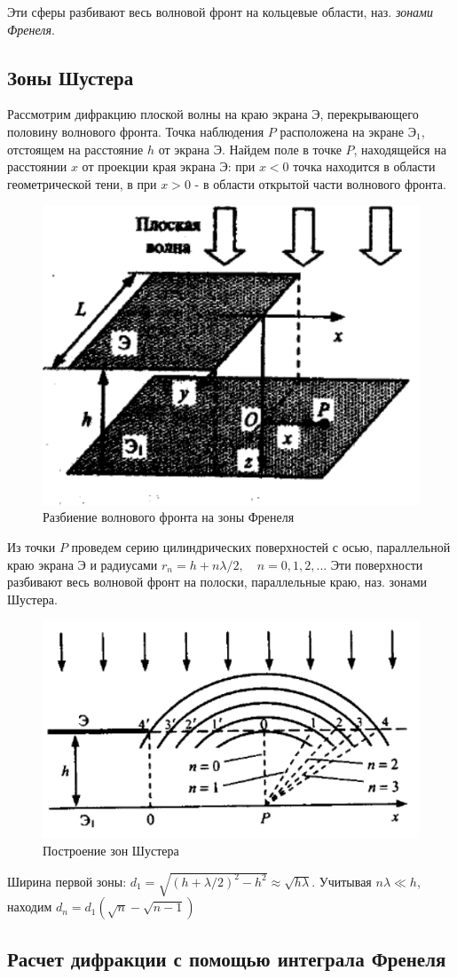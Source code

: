 \documentclass[a4paper,12pt]{article}
\begin{document}
Эти сферы разбивают весь волновой фронт на кольцевые области, наз. \textit{зонами Френеля}.

\subsection{Зоны Шустера}

Рассмотрим дифракцию плоской волны на краю экрана Э, перекрывающего половину волнового фронта. Точка наблюдения $P$ расположена на экране $\text{Э}_1$, отстоящем на расстояние $h$ от экрана Э. Найдем поле в точке $P$, находящейся на расстоянии $x$ от проекции края экрана Э: при $x<0$ точка находится в области геометрической тени, в при $x>0$ - в области открытой части волнового фронта.

\begin{figure}[h]
\centering
\includegraphics[width=0.4\linewidth]{img7.png}
\caption{Разбиение волнового фронта на зоны Френеля}
\label{img7}
\end{figure}

Из точки $P$ проведем серию цилиндрических поверхностей с осью, параллельной краю экрана Э и радиусами $r_n=h+n\lambda/2, \quad n=0,1,2,..$. Эти поверхности разбивают весь волновой фронт на полоски, параллельные краю, наз. зонами Шустера.

\begin{figure}[h]
\centering
\includegraphics[width=0.4\linewidth]{img8.png}
\caption{Построение зон Шустера}
\label{img8}
\end{figure}

Ширина первой зоны: $d_1=\sqrt{(h+\lambda/2)^2-h^2}\approx\sqrt{h\lambda}$. Учитывая $n\lambda\ll h$, находим $d_n=d_1(\sqrt{n}-\sqrt{n-1})$

\subsection{Расчет дифракции с помощью интеграла Френеля}
\end{document}
